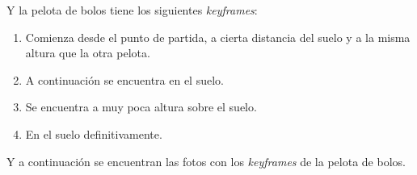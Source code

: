 \documentclass{article}
\begin{document}
Y la pelota de bolos tiene los siguientes \textit{keyframes}:

\begin{enumerate}
    \item Comienza desde el punto de partida, a cierta distancia del suelo y a la misma altura que la otra pelota.
    \item A continuación se encuentra en el suelo.
    \item Se encuentra a muy poca altura sobre el suelo.
    \item En el suelo definitivamente.
\end{enumerate}

Y a continuación se encuentran las fotos con los \textit{keyframes} de la pelota de bolos.
\begin{figure}[H]
	\begin{subfigure}[H]{0.15\textwidth}
	    \centering

\end{subfigure}
\end{figure}
\end{document}
